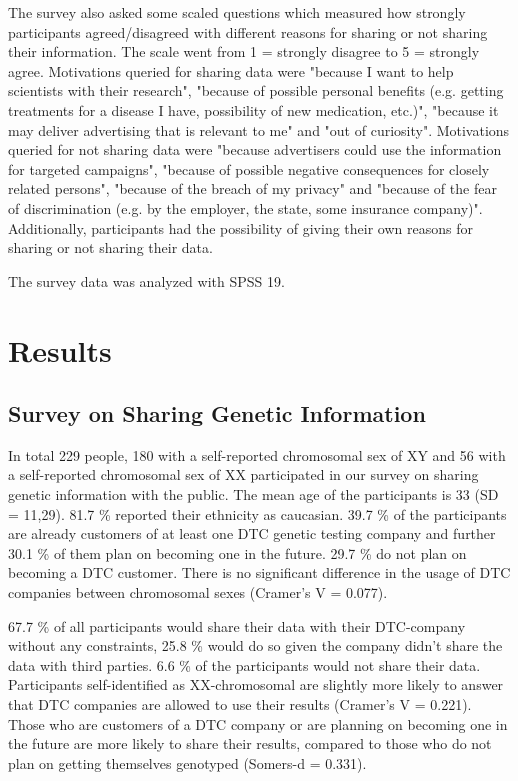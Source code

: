 \documentclass[10pt]{article}
\begin{document}
The survey also asked some scaled questions which measured how strongly participants agreed/disagreed with different reasons for sharing or not sharing their 
information. The scale went from 1 = strongly disagree to  5 = strongly agree. Motivations queried for sharing data 
were "because I want to help scientists with their research", "because of possible personal benefits (e.g. getting treatments for a disease I have, 
possibility of new medication, etc.)", "because it may deliver advertising that is relevant to me" and "out of curiosity". Motivations queried for not sharing 
data were "because advertisers could use the information for targeted campaigns", "because of possible negative consequences for closely related persons", 
"because of the breach of my privacy" and "because of the fear of discrimination (e.g. by the employer, the state, some insurance company)". 
Additionally, participants had the possibility of giving their own reasons for sharing or not sharing their data.

The survey data was analyzed with SPSS 19. 

\section*{Results}

\subsection*{Survey on Sharing Genetic Information}
In total 229 people, 180 with a self-reported chromosomal sex of XY and 56 with a self-reported chromosomal sex of XX participated in our survey on sharing genetic information with the public. 
The mean age of the participants is 33 (SD = 11,29). 81.7 \% reported their ethnicity as caucasian. 39.7 \% of the participants are already 
customers of at least one DTC genetic testing company and further 30.1 \% of them plan on becoming one in the future. 29.7 \% do not plan on 
becoming a DTC customer. There is no significant difference in the usage of DTC companies between chromosomal sexes (Cramer's V = 0.077). 

67.7 \% of all participants would share their data with their DTC-company without any constraints, 25.8 \% would do so given the company 
didn't share the data with third parties. 6.6 \% of the participants would not share their data. Participants self-identified as XX-chromosomal are slightly more likely to answer that DTC companies are allowed to use their results (Cramer's V = 0.221). Those who are customers of a DTC company or are planning on becoming one in 
the future are more likely to share their results, compared to those who do not plan on getting themselves genotyped (Somers-d = 0.331). 
\end{document}
